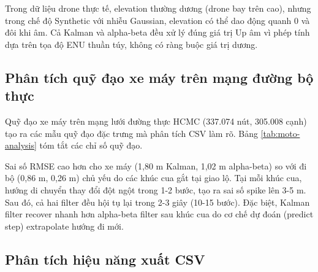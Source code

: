 Trong dữ liệu drone thực tế, elevation thường dương (drone bay trên cao), nhưng trong chế độ Synthetic với nhiễu Gaussian, elevation có thể dao động quanh 0 và đôi khi âm. Cả Kalman và alpha-beta đều xử lý đúng giá trị Up âm vì phép tính dựa trên tọa độ ENU thuần túy, không có ràng buộc giá trị dương.

\subsection{Phân tích quỹ đạo xe máy trên mạng đường bộ thực}

\hspace{0.5cm} Quỹ đạo xe máy trên mạng lưới đường thực HCMC (337.074 nút, 305.008 cạnh) tạo ra các mẫu quỹ đạo đặc trưng mà phân tích CSV làm rõ. Bảng \ref{tab:moto-analysis} tóm tắt các chỉ số quỹ đạo.

\begin{table}[H]
\centering
{}
\caption{Chỉ số quỹ đạo xe máy trên mạng đường bộ thực}
\label{tab:moto-analysis}
\end{table}

Sai số RMSE cao hơn cho xe máy (1,80 m Kalman, 1,02 m alpha-beta) so với đi bộ (0,86 m, 0,26 m) chủ yếu do các khúc cua gắt tại giao lộ. Tại mỗi khúc cua, hướng di chuyển thay đổi đột ngột trong 1-2 bước, tạo ra sai số spike lên 3-5 m. Sau đó, cả hai filter đều hội tụ lại trong 2-3 giây (10-15 bước). Đặc biệt, Kalman filter recover nhanh hơn alpha-beta filter sau khúc cua do cơ chế dự đoán (predict step) extrapolate hướng đi mới.

\subsection{Phân tích hiệu năng xuất CSV}

